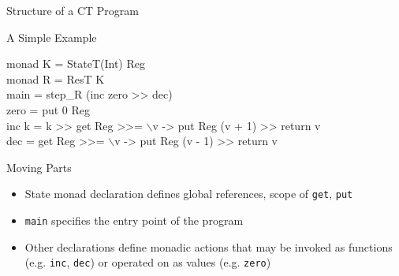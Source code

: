 \documentclass{beamer}
\begin{document}
\begin{frame}{Structure of a CT Program}

\begin{structure}{A Simple Example}
\begin{onlinebox}{9cm}\begin{texttt}{\begin{flushleft}{\begin{scriptsize}{
monad K = StateT(Int) Reg\\
monad R = ResT K\\
\smallskip
main = step\_R (inc zero >> dec)\\
\smallskip
zero = put 0 Reg\\
\smallskip
inc k = k >> get Reg >>= $\backslash$v -> put Reg (v + 1) >> return v\\
\smallskip
dec = get Reg >>= $\backslash$v -> put Reg (v - 1) >> return v
}\end{scriptsize}}\end{flushleft}}\end{texttt}
\smallskip
\end{onlinebox}
\end{structure}

\bigskip

\begin{structure}{Moving Parts}
\begin{small}
\begin{itemize}

\item{State monad declaration defines global references, scope of \texttt{get}, \texttt{put}}
\item{\texttt{main} specifies the entry point of the program}
\item{Other declarations define monadic actions that may be invoked as functions (e.g. \texttt{inc}, \texttt{dec}) or operated on as values (e.g. \texttt{zero})}
\end{itemize}
\end{small}

\end{structure}

\end{frame}
\end{document}

